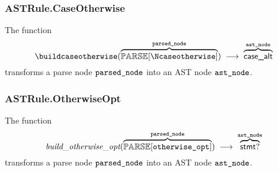 \begin{mathpar}
\end{mathpar}

\subsubsection{ASTRule.CaseOtherwise\label{sec:ASTRule.CaseOtherwise}}
\hypertarget{build-caseotherwise}{}
The function
\[
\buildcaseotherwise(\overname{\parsenode{\Ncaseotherwise}}{\vparsednode}) \;\aslto\; \overname{\casealt}{\vastnode}
\]
transforms a parse node $\vparsednode$ into an AST node $\vastnode$.

\begin{mathpar}
\end{mathpar}

\subsubsection{ASTRule.OtherwiseOpt\label{sec:ASTRule.OtherwiseOpt}}
\hypertarget{build-otherwiseopt}{}
The function
\[
\buildotherwiseopt(\overname{\parsenode{\Notherwiseopt}}{\vparsednode}) \;\aslto\; \overname{\stmt?}{\vastnode}
\]
transforms a parse node $\vparsednode$ into an AST node $\vastnode$.

\begin{mathpar}
\end{mathpar}


